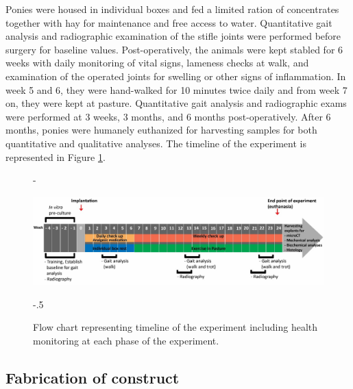 \documentclass[twocolumn, empirical, authordate, issue]{jote-new-article}
\begin{document}
Ponies were housed in individual boxes and fed a limited ration of concentrates together with hay for maintenance and free access to water. Quantitative gait analysis and radiographic examination of the stifle joints were performed before surgery for baseline values. Post-operatively, the animals were kept stabled for 6 weeks with daily monitoring of vital signs, lameness checks at walk, and examination of the operated joints for swelling or other signs of inflammation. In week 5 and 6, they were hand-walked for 10 minutes twice daily and from week 7 on, they were kept at pasture. Quantitative gait analysis and radiographic exams were performed at 3 weeks, 3 months, and 6 months post-operatively. After 6 months, ponies were humanely euthanized for harvesting samples for both quantitative and qualitative analyses. The timeline of the experiment is represented in Figure \ref{fig:figure1}.

\begin{figure}[t]
\captionsetup{width=\dimexpr\linewidth  +\fullwidthlen\relax}
\begin{adjustwidth}{-\fullwidthlen}{}

 \includegraphics[width=\textwidth+\fullwidthlen]{media/image1.jpg}
 \end{adjustwidth}
 \begin{adjustwidth}{-.5\fullwidthlen}{}
\caption{Flow chart representing timeline of the experiment including health monitoring at each phase of the experiment.}
\label{fig:figure1}

\end{adjustwidth}

\end{figure}

\subsection{Fabrication of construct} 
\end{document}
